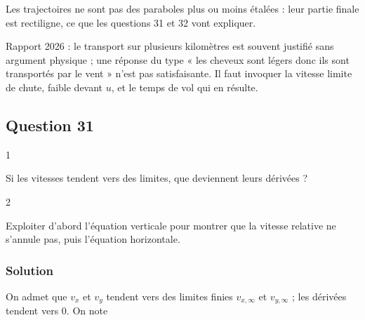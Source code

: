 \documentclass[11pt,a4paper]{article}
\newcommand{\equationajustee}[1]{%
  \sbox{\boiteequation}{$\displaystyle #1$}%
  \ifdim\wd\boiteequation>\linewidth
    \[\resizebox{\linewidth}{!}{\usebox{\boiteequation}}\]%
  \else
    \[#1\]%
  \fi}
\begin{document}
\begin{piege}

Les trajectoires ne sont pas des paraboles plus ou moins étalées : leur partie finale est rectiligne, ce que les questions 31 et 32 vont expliquer.

\end{piege}

\begin{jury}

Rapport 2026 : le transport sur plusieurs kilomètres est souvent justifié sans argument physique ; une réponse du type « les cheveux sont légers donc ils sont transportés par le vent » n'est pas satisfaisante. Il faut invoquer la vitesse limite de chute, faible devant \(u\), et le temps de vol qui en résulte.

\end{jury}

\hypertarget{question-31}{%
\subsection{Question 31}\label{question-31}}

\begin{indication}{1}

Si les vitesses tendent vers des limites, que deviennent leurs dérivées ?

\end{indication}

\begin{indication}{2}

Exploiter d'abord l'équation verticale pour montrer que la vitesse relative ne s'annule pas, puis l'équation horizontale.

\end{indication}

\hypertarget{solution-30}{%
\subsubsection{Solution}\label{solution-30}}

On admet que \(v_x\) et \(v_y\) tendent vers des limites finies \(v_{x,\infty}\) et \(v_{y,\infty}\) ; les dérivées tendent vers \(0\). On note

\equationajustee{\begin{aligned}
N &= \|\vec v_\infty - \vec u\| \\
&= \sqrt{(v_{x,\infty} - u)^2 + v_{y,\infty}^2}
\end{aligned}}
\end{document}
